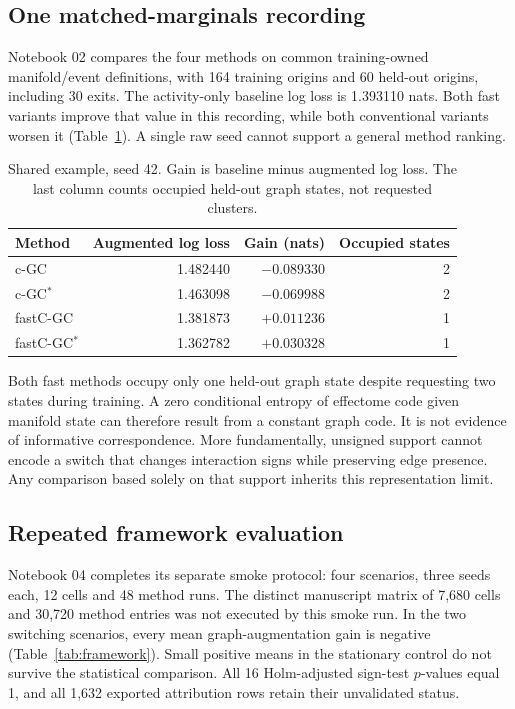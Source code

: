 \documentclass[11pt,a4paper]{article}
\newcommand{\cgc}{c-GC}
\newcommand{\cgcs}{c-GC$^{*}$}
\newcommand{\fastcgc}{fastC-GC}
\newcommand{\fastcgcs}{fastC-GC$^{*}$}
\begin{document}
\subsection{One matched-marginals recording}

Notebook 02 compares the four methods on common training-owned manifold/event
definitions, with 164 training origins and 60 held-out origins, including 30 exits.
The activity-only baseline log loss is 1.393110 nats. Both fast variants improve
that value in this recording, while both conventional variants worsen it
(Table~\ref{tab:shared}). A single raw seed cannot support a general method ranking.

\begin{table}[htbp]
\centering
\caption{Shared example, seed 42. Gain is baseline minus augmented log loss.
The last column counts occupied held-out graph states, not requested clusters.}
\label{tab:shared}
\begin{tabular}{@{}lrrr@{}}
\toprule
Method & Augmented log loss & Gain (nats) & Occupied states \\
\midrule
\cgc & 1.482440 & $-0.089330$ & 2 \\
\cgcs & 1.463098 & $-0.069988$ & 2 \\
\fastcgc & 1.381873 & $+0.011236$ & 1 \\
\fastcgcs & 1.362782 & $+0.030328$ & 1 \\
\bottomrule
\end{tabular}
\end{table}

Both fast methods occupy only one held-out graph state despite requesting two
states during training. A zero conditional entropy of effectome code given
manifold state can therefore result from a constant graph code. It is not evidence
of informative correspondence. More fundamentally, unsigned support cannot encode
a switch that changes interaction signs while preserving edge presence. Any
comparison based solely on that support inherits this representation limit.

\subsection{Repeated framework evaluation}

Notebook 04 completes its separate smoke protocol: four scenarios, three seeds
each, 12 cells and 48 method runs. The distinct manuscript matrix of 7,680 cells
and 30,720 method entries was not executed by this smoke run. In the two switching
scenarios, every mean graph-augmentation gain is negative
(Table~\ref{tab:framework}). Small positive means in the stationary control do not
survive the statistical comparison. All 16 Holm-adjusted sign-test $p$-values equal
1, and all 1,632 exported attribution rows retain their unvalidated status.
\end{document}
